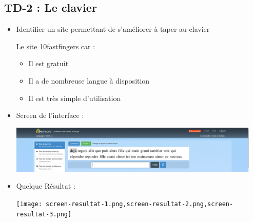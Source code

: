 \documentclass[12pt]{article}
\begin{document}
	\subsection{TD-2 : Le clavier}
\begin{itemize}
	\item Identifier un site permettant de s'améliorer à taper au clavier


\vspace{0.3cm}
\href{https://10fastfingers.com/typing-test/french#}{Le site 10fastfingers} car :
 \vspace{0.3cm}
		\begin{itemize}
			\item Il est gratuit
			\item Il a de nombreuse langue à disposition 
			\item Il est très simple d'utilisation

		\end{itemize}

\vspace{0.3cm}
\item Screen de l'interface : 
\vspace{0.3cm}

\begin{center}
  \includegraphics[width=12cm]{screen-10fastfingers.png}
\end{center}

\vspace{0.3cm}
\item Quelque Résultat :
\vspace{0.3cm}

\begin{center}
	\texttt{[image: screen-resultat-1.png,screen-resultat-2.png,screen-resultat-3.png]}
\end{center}

\end{itemize}
\end{document}
